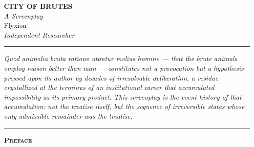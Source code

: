 \documentclass[12pt, oneside]{article}
\begin{document}

\thispagestyle{empty}

\vspace*{3em}

\begin{center}
  {\Huge\bfseries CITY OF BRUTES}\\[1.2em]
  {\large\itshape A Screenplay}\\[2.5em]
  {\normalsize Flyxion}\\[1em]
  {\small\itshape Independent Researcher}\\[3em]
\end{center}

\begin{center}
  {\small\color{rulecolor}\rule{0.5\linewidth}{0.4pt}}
\end{center}

\vspace{1.5em}

\begin{center}
\begin{minipage}{0.78\linewidth}
\small\itshape
\noindent\textit{Quod animalia bruta ratione utantur melius homine} --- that the brute animals employ reason better than man --- constitutes not a provocation but a hypothesis pressed upon its author by decades of irresolvable deliberation, a residue crystallized at the terminus of an institutional career that accumulated impossibility as its primary product. This screenplay is the event-history of that accumulation: not the treatise itself, but the sequence of irreversible states whose only admissible remainder was the treatise.
\end{minipage}
\end{center}

\vspace{2em}

\begin{center}
  {\small\color{rulecolor}\rule{0.5\linewidth}{0.4pt}}
\end{center}

\newpage


\thispagestyle{empty}

\vspace*{2em}

\begin{center}
  {\large\bfseries\scshape Preface}
\end{center}
\end{document}
